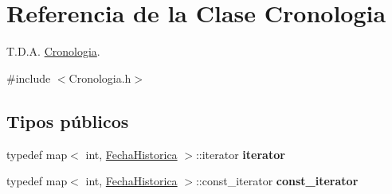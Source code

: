 \hypertarget{classCronologia}{}\section{Referencia de la Clase Cronologia}
\label{classCronologia}


T.\+D.\+A. \hyperlink{classCronologia}{Cronologia}.  




{\ttfamily \#include $<$Cronologia.\+h$>$}

\subsection*{Tipos públicos}
\begin{DoxyCompactItemize}
\item 
\mbox{\label{classCronologia_aa4afcb1f045424a8350e655329522813}} 
typedef map$<$ int, \hyperlink{classFechaHistorica}{Fecha\+Historica} $>$\+::iterator {\bfseries iterator}
\item 
\mbox{\label{classCronologia_a1b8bbb2fab52f9f57d59dffb537541ca}} 
typedef map$<$ int, \hyperlink{classFechaHistorica}{Fecha\+Historica} $>$\+::const\+\_\+iterator {\bfseries const\+\_\+iterator}
\end{DoxyCompactItemize}
